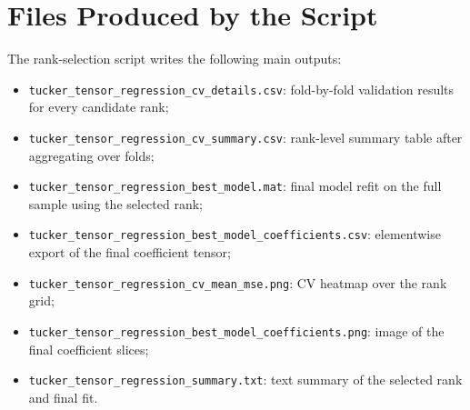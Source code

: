 \documentclass[11pt]{article}
\begin{document}
\section{Files Produced by the Script}
The rank-selection script writes the following main outputs:
\begin{itemize}[leftmargin=2em]
\item \texttt{tucker\_tensor\_regression\_cv\_details.csv}: fold-by-fold validation results for every candidate rank;
\item \texttt{tucker\_tensor\_regression\_cv\_summary.csv}: rank-level summary table after aggregating over folds;
\item \texttt{tucker\_tensor\_regression\_best\_model.mat}: final model refit on the full sample using the selected rank;
\item \texttt{tucker\_tensor\_regression\_best\_model\_coefficients.csv}: elementwise export of the final coefficient tensor;
\item \texttt{tucker\_tensor\_regression\_cv\_mean\_mse.png}: CV heatmap over the rank grid;
\item \texttt{tucker\_tensor\_regression\_best\_model\_coefficients.png}: image of the final coefficient slices;
\item \texttt{tucker\_tensor\_regression\_summary.txt}: text summary of the selected rank and final fit.
\end{itemize}
\end{document}
